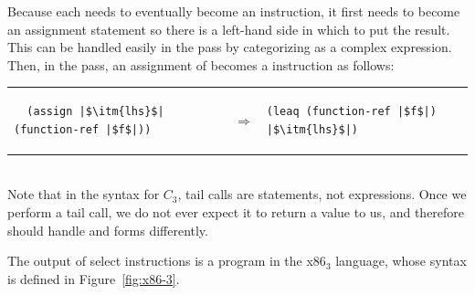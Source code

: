 \documentclass[11pt]{book}
\begin{document}
Because each  needs to eventually become an
 instruction, it first needs to become an assignment
statement so there is a left-hand side in which to put the
result. This can be handled easily in the  pass by
categorizing  as a complex expression.  Then, in
the  pass, an assignment of
 becomes a  instruction as follows: \\
\begin{tabular}{lll}
\begin{minipage}{0.45\textwidth}
\begin{lstlisting}
  (assign |$\itm{lhs}$| (function-ref |$f$|))
\end{lstlisting}
\end{minipage}
&
$\Rightarrow$
&
\begin{minipage}{0.4\textwidth}
\begin{lstlisting}
(leaq (function-ref |$f$|) |$\itm{lhs}$|)
\end{lstlisting}
\end{minipage}
\end{tabular} \\
%
Note that in the syntax for $C_3$, tail calls are statements, not
expressions. Once we perform a tail call, we do not ever expect it to
return a value to us, and  therefore should handle
 and  forms differently.

The output of select instructions is a program in the x86$_3$
language, whose syntax is defined in Figure~\ref{fig:x86-3}.
\end{document}
